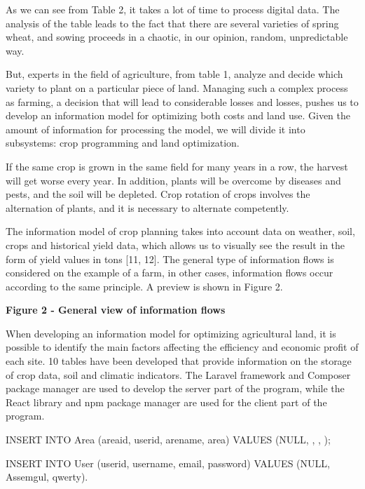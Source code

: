 As we can see from Table 2, it takes a lot of time to process digital
data. The analysis of the table leads to the fact that there are several
varieties of spring wheat, and sowing proceeds in a chaotic, in our
opinion, random, unpredictable way.

But, experts in the field of agriculture, from table 1, analyze and
decide which variety to plant on a particular piece of land. Managing
such a complex process as farming, a decision that will lead to
considerable losses and losses, pushes us to develop an information
model for optimizing both costs and land use. Given the amount of
information for processing the model, we will divide it into subsystems:
crop programming and land optimization.

If the same crop is grown in the same field for many years in a row, the
harvest will get worse every year. In addition, plants will be overcome
by diseases and pests, and the soil will be depleted. Crop rotation of
crops involves the alternation of plants, and it is necessary to
alternate competently.

The information model of crop planning takes into account data on
weather, soil, crops and historical yield data, which allows us to
visually see the result in the form of yield values in tons {[}11,
12{]}. The general type of information flows is considered on the
example of a farm, in other cases, information flows occur according to
the same principle. A preview is shown in Figure 2.

{\bfseries Figure 2 - General view of information flows}

When developing an information model for optimizing agricultural land,
it is possible to identify the main factors affecting the efficiency and
economic profit of each site. 10 tables have been developed that provide
information on the storage of crop data, soil and climatic indicators.
The Laravel framework and Composer package manager are used to develop
the server part of the program, while the React library and npm package
manager are used for the client part of the program.

INSERT INTO Area (areaid, userid, arename, area) VALUES (NULL,
\textquotesingle, \textquotesingle,
\textquotesingle);

INSERT INTO User (userid, username, email, password) VALUES (NULL,
\textquotesingle Assemgul\textquotesingle,
\textquotesingle qwerty\textquotesingle).

